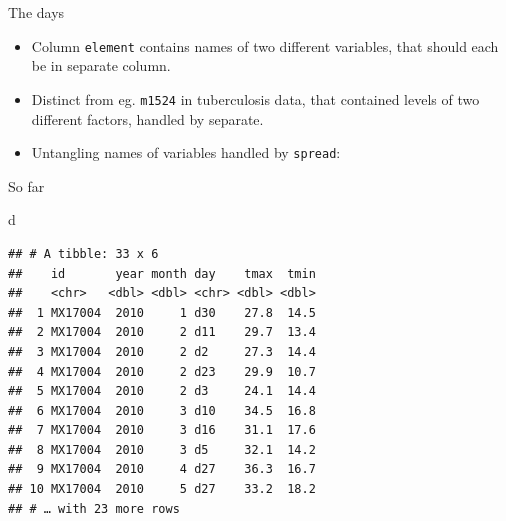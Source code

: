 \documentclass[ignorenonframetext,]{beamer}
\newenvironment{Shaded}{\begin{snugshade}}{\end{snugshade}}
\newcommand{\DataTypeTok}[1]{\textcolor[rgb]{0.13,0.29,0.53}{#1}}
\newcommand{\KeywordTok}[1]{\textcolor[rgb]{0.13,0.29,0.53}{\textbf{#1}}}
\newcommand{\NormalTok}[1]{#1}
\newcommand{\OperatorTok}[1]{\textcolor[rgb]{0.81,0.36,0.00}{\textbf{#1}}}
\newcommand{\StringTok}[1]{\textcolor[rgb]{0.31,0.60,0.02}{#1}}
\providecommand{\tightlist}{%
  \setlength{\itemsep}{0pt}\setlength{\parskip}{0pt}}
\begin{document}
\begin{frame}[fragile]{The days}
\protect\hypertarget{the-days}{}

\begin{itemize}
\tightlist
\item
  Column \texttt{element} contains names of two different variables,
  that should each be in separate column.
\item
  Distinct from eg. \texttt{m1524} in tuberculosis data, that contained
  levels of two different factors, handled by separate.
\item
  Untangling names of variables handled by \texttt{spread}:
\end{itemize}

\begin{Shaded}
\end{Shaded}

\end{frame}

\begin{frame}[fragile]{So far}
\protect\hypertarget{so-far-1}{}

\begin{Shaded}
\begin{Highlighting}[]
\NormalTok{d}
\end{Highlighting}
\end{Shaded}

\begin{verbatim}
## # A tibble: 33 x 6
##    id       year month day    tmax  tmin
##    <chr>   <dbl> <dbl> <chr> <dbl> <dbl>
##  1 MX17004  2010     1 d30    27.8  14.5
##  2 MX17004  2010     2 d11    29.7  13.4
##  3 MX17004  2010     2 d2     27.3  14.4
##  4 MX17004  2010     2 d23    29.9  10.7
##  5 MX17004  2010     2 d3     24.1  14.4
##  6 MX17004  2010     3 d10    34.5  16.8
##  7 MX17004  2010     3 d16    31.1  17.6
##  8 MX17004  2010     3 d5     32.1  14.2
##  9 MX17004  2010     4 d27    36.3  16.7
## 10 MX17004  2010     5 d27    33.2  18.2
## # … with 23 more rows
\end{verbatim}

\end{frame}
\end{document}

